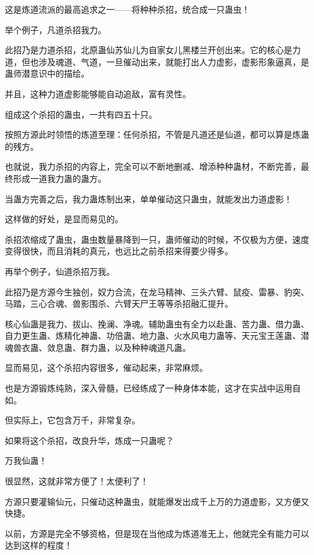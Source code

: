 
\begin{this_body}

这是炼道流派的最高追求之一——将种种杀招，统合成一只蛊虫！

举个例子，凡道杀招我力。

此招乃是力道杀招，北原蛊仙苏仙儿为自家女儿黑楼兰开创出来。它的核心是力道，但也涉及魂道、气道，一旦催动出来，就能打出人力虚影，虚影形象逼真，是蛊师潜意识中的描绘。

并且，这种力道虚影能够能自动追敌，富有灵性。

组成这个杀招的蛊虫，一共有四五十只。

按照方源此时领悟的炼道至理：任何杀招，不管是凡道还是仙道，都可以算是炼蛊的残方。

也就说，我力杀招的内容上，完全可以不断地删减、增添种种蛊材，不断完善，最终形成一道我力蛊的蛊方。

当蛊方完善之后，我力蛊炼制出来，单单催动这只蛊虫，就能发出力道虚影！

这样做的好处，是显而易见的。

杀招浓缩成了蛊虫，蛊虫数量暴降到一只，蛊师催动的时候，不仅极为方便，速度变得很快，而且消耗的真元，也远比之前杀招来得要少得多。

再举个例子，仙道杀招万我。

此招乃是方源今生独创，奴力合流，在龙马精神、三头六臂、鼠疫、雷暴、豹突、马踏，三心合魂、兽影围杀、六臂天尸王等等杀招融汇提升。

核心仙蛊是我力、拔山、挽澜、净魂。辅助蛊虫有全力以赴蛊、苦力蛊、借力蛊、自力更生蛊、炼精化神蛊、功倍蛊、地力蛊、火水风电力蛊等、天元宝王莲蛊、潜魂兽衣蛊、敛息蛊、群力蛊，以及种种魂道凡蛊。

显而易见，这个杀招内容很多，催动起来，非常麻烦。

也是方源锻炼纯熟，深入骨髓，已经练成了一种身体本能，这才在实战中运用自如。

但实际上，它包含万千，非常复杂。

如果将这个杀招，改良升华，炼成一只蛊呢？

万我仙蛊！

很显然，这就非常方便了！太便利了！

方源只要灌输仙元，只催动这种蛊虫，就能爆发出成千上万的力道虚影，又方便又快捷。

以前，方源是完全不够资格，但是现在当他成为炼道准无上，他就完全有能力可以达到这样的程度！


\end{this_body}
